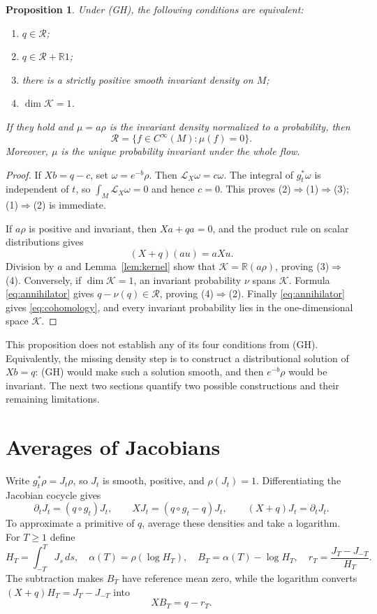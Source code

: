 \documentclass[11pt]{article}
\newtheorem{proposition}[theorem]{Proposition}
\theoremstyle{definition}
\theoremstyle{remark}
\newcommand{\R}{\mathbb R}
\newcommand{\calR}{\mathcal R}
\newcommand{\calK}{\mathcal K}
\begin{document}
\begin{proposition}\label{prop:density}
Under (GH), the following conditions are equivalent:
\begin{enumerate}
\item $q\in\calR$;
\item $q\in\calR+\R1$;
\item there is a strictly positive smooth invariant density on $M$;
\item $\dim\calK=1$.
\end{enumerate}
If they hold and $\mu=a\rho$ is the invariant density normalized to a probability, then
\begin{equation}\label{eq:cohomology}
 \calR=\{f\in C^\infty(M):\mu(f)=0\}.
\end{equation}
Moreover, $\mu$ is the unique probability invariant under the whole flow.
\end{proposition}
\begin{proof}
If $Xb=q-c$, set $\omega=e^{-b}\rho$. Then $\mathcal L_X\omega=c\omega$. The integral of $g_t^*\omega$ is independent of $t$, so $\int_M\mathcal L_X\omega=0$ and hence $c=0$. This proves (2)$\Rightarrow$(1)$\Rightarrow$(3); (1)$\Rightarrow$(2) is immediate.

If $a\rho$ is positive and invariant, then $Xa+qa=0$, and the product rule on scalar distributions gives
\[
 (X+q)(au)=aXu.
\]
Division by $a$ and Lemma~\ref{lem:kernel} show that $\calK=\R(a\rho)$, proving (3)$\Rightarrow$(4). Conversely, if $\dim\calK=1$, an invariant probability $\nu$ spans $\calK$. Formula \eqref{eq:annihilator} gives $q-\nu(q)\in\calR$, proving (4)$\Rightarrow$(2). Finally \eqref{eq:annihilator} gives \eqref{eq:cohomology}, and every invariant probability lies in the one-dimensional space $\calK$.
\end{proof}

This proposition does not establish any of its four conditions from (GH). Equivalently, the missing density step is to construct a distributional solution of $Xb=q$: (GH) would make such a solution smooth, and then $e^{-b}\rho$ would be invariant. The next two sections quantify two possible constructions and their remaining limitations.

\section{Averages of Jacobians}
\label{sec:jacobians}

Write $g_t^*\rho=J_t\rho$, so $J_t$ is smooth, positive, and $\rho(J_t)=1$. Differentiating the Jacobian cocycle gives
\[
 \partial_tJ_t=(q\circ g_t)J_t,\qquad
 XJ_t=(q\circ g_t-q)J_t,\qquad
 (X+q)J_t=\partial_tJ_t.
\]
To approximate a primitive of $q$, average these densities and take a logarithm. For $T\ge1$ define
\begin{equation}\label{eq:B}
 H_T=\int_{-T}^T J_s\,ds,\quad
 \alpha(T)=\rho(\log H_T),\quad
 B_T=\alpha(T)-\log H_T,\quad
 r_T=\frac{J_T-J_{-T}}{H_T}.
\end{equation}
The subtraction makes $B_T$ have reference mean zero, while the logarithm converts $(X+q)H_T=J_T-J_{-T}$ into
\begin{equation}\label{eq:B-eqn}
 XB_T=q-r_T.
\end{equation}
\end{document}
